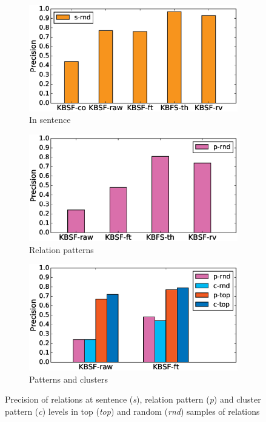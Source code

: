 \begin{figure}[t]
   \centering
    \begin{subfigure}[b]{0.49\textwidth}
        \includegraphics[width=\textwidth]{ch04_kbconstruction_pics/s-rnd100.eps}
        \caption{In sentence}
        \label{fig:kb:p_sentence}
    \end{subfigure}
    \begin{subfigure}[b]{0.49\textwidth}
        \includegraphics[width=\textwidth]{ch04_kbconstruction_pics/p-rnd100.eps}
        \caption{Relation patterns}
        \label{fig:kb:p_patterns}
    \end{subfigure}
    \begin{subfigure}[b]{0.70\textwidth}
        \includegraphics[width=\textwidth]{ch04_kbconstruction_pics/eval_p_c.eps}
        \caption{Patterns and clusters}
        \label{fig:kb:p_clusters}
    \end{subfigure}
    \caption[Precision of relations.]{Precision of relations at sentence (\textit{s}), relation pattern (\textit{p}) and cluster pattern (\textit{c}) levels in top (\textit{top}) and random (\textit{rnd}) samples of relations}\label{fig:kb:eval_relations}
\end{figure}


